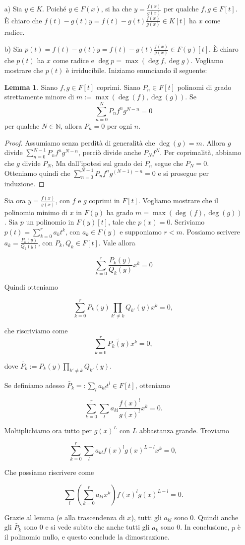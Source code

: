 \documentclass[12pt,a4paper]{report}
\theoremstyle{definition}
\newtheorem{lemma}[teo]{Lemma}  %
\begin{document}
\begin{itemize}
\item[a)] Sia $y \in K$. Poiché $y \in F(x)$, si ha che $y=\frac{f(x)}{g(x)}$ per qualche $f, g \in F[t]$. È chiaro che $f(t)-g(t) y=f(t)-g(t) \frac{f(x)}{g(x)} \in K[t]$ ha $x$ come radice.
\item[b)] Sia $p(t)=f(t)-g(t) y=f(t)-g(t) \frac{f(x)}{g(x)} \in F(y)[t]$. È chiaro che $p(t)$ ha $x$ come radice e $\deg p=\max(\deg f, \deg g)$. Vogliamo mostrare che $p(t)$ è irriducibile. Iniziamo enunciando il seguente:

\begin{lemma}
Siano $f,g \in F[t]$ coprimi. Siano $P_n \in F[t]$ polinomi di grado strettamente minore di $m := \max(\deg(f), \deg(g))$. Se 
$$\sum_{n=0}^N P_n f^n g^{N-n} = 0$$ 
per qualche $N \in \mathbb{N}$, allora $P_n=0$ per ogni $n$.
\end{lemma}
\begin{proof}
Assumiamo senza perdità di generalità che $\deg(g) = m$. Allora $g$ divide $\sum_{n=0}^{N-1} P_n f^n g^{N-n}$, perciò divide anche $P_N f^N$. Per coprimalità, abbiamo che $g$ divide $P_N$, Ma dall'ipotesi sul grado dei $P_n$ segue che $P_N=0$. Otteniamo quindi che $\sum_{n=0}^{N-1} P_n f^n g^{(N-1)-n} = 0$ e si prosegue per induzione.
\end{proof}

Sia ora $y = \frac{f(x)}{g(x)}$, con $f$ e $g$ coprimi in $F[t]$. Vogliamo mostrare che il polinomio minimo di $x$ in $F(y)$ ha grado $m = \max(\deg(f), \deg(g))$. Sia $p$ un polinomio in $F(y)[t]$, tale che $p(x) = 0$. Scriviamo $p(t) = \sum_{k=0}^r a_k t^k$, con $a_k \in F(y)$ e supponiamo $r < m$. Possiamo scrivere $a_k = \frac{P_{k}(y)}{Q_{k}(y)}$, con $P_{k}, Q_{k} \in F[t]$. Vale allora

$$\sum_{k=0}^r \frac{P_{k}(y)}{Q_{k}(y)} x^k = 0$$

Quindi otteniamo

$$\sum_{k=0}^r P_{k}(y) \prod_{k' \neq k} Q_{k'} (y) x^k = 0,$$

che riscriviamo come
$$\sum_{k=0}^r \widetilde{P_{k}(y)} x^k = 0,$$

dove $\widetilde{P_{k}} := P_{k}(y) \prod_{k' \neq k} Q_{k'} (y)$.

Se definiamo adesso $\widetilde{P_{k}} =: \sum_l a_{kl} t^l \in F[t]$, otteniamo 

$$
\sum_{k=0}^r \sum_l a_{kl} \frac{f(x)^l}{g(x)^l} x^k = 0.
$$

Moltiplichiamo ora tutto per $g(x)^L$ con $L$ abbastanza grande. Troviamo

$$
\sum_{k=0}^r \sum_l a_{kl} f(x)^l g(x)^{L - l} x^k = 0,
$$ 

Che possiamo riscrivere come

$$
\sum_{l} (\sum_{k= 0}^r a_{kl} x^k) f(x)^l g(x)^{L-l} = 0.
$$

Grazie al lemma (e alla trascendenza di $x$), tutti gli $a_{kl}$ sono 0. Quindi anche gli $\widetilde{P_{k}}$ sono 0 e si vede subito che anche tutti gli $a_k$ sono 0. In conclusione, $p$ è il polinomio nullo, e questo conclude la dimostrazione.
\end{itemize}




 
\end{document}
